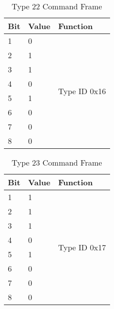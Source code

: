 \documentclass[]{article}
\begin{document}
\begin{table}[ht]
	\centering
	\begin{tabular}{lll}
		\hline
		\textbf{Bit} & \textbf{Value} & \textbf{Function}             \\ \hline
		1            & 0              & \multirow{8}{*}{Type ID 0x16} \\
		2            & 1              &                               \\
		3            & 1              &                               \\
		4            & 0              &                               \\
		5            & 1              &                               \\
		6            & 0              &                               \\
		7            & 0              &                               \\
		8            & 0              &                               \\ \hline
	\end{tabular}
	\caption{Type 22 Command Frame}
	\label{tab:type-22-frame}
\end{table}

\begin{table}[ht]
	\centering
	\begin{tabular}{lll}
		\hline
		\textbf{Bit} & \textbf{Value} & \textbf{Function}             \\ \hline
		1            & 1              & \multirow{8}{*}{Type ID 0x17} \\
		2            & 1              &                               \\
		3            & 1              &                               \\
		4            & 0              &                               \\
		5            & 1              &                               \\
		6            & 0              &                               \\
		7            & 0              &                               \\
		8            & 0              &                               \\ \hline
	\end{tabular}
	\caption{Type 23 Command Frame}
	\label{tab:type-23-frame}
\end{table}
\end{document}
